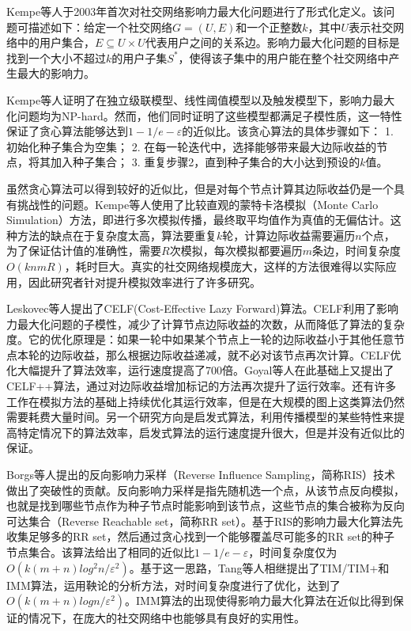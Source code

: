 Kempe等人\cite{kempe2003maximizing}于2003年首次对社交网络影响力最大化问题进行了形式化定义。该问题可描述如下：给定一个社交网络$G=(U,E)$和一个正整数$k$，其中$U$表示社交网络中的用户集合，$E \subseteq U \times U$代表用户之间的关系边。影响力最大化问题的目标是找到一个大小不超过$k$的用户子集$S^*$，使得该子集中的用户能在整个社交网络中产生最大的影响力。

Kempe等人证明了在独立级联模型、线性阈值模型以及触发模型下，影响力最大化问题均为NP-hard。然而，他们同时证明了这些模型都满足子模性质，这一特性保证了贪心算法能够达到$1-1/e-\varepsilon$的近似比。该贪心算法的具体步骤如下：
1. 初始化种子集合为空集；
2. 在每一轮迭代中，选择能够带来最大边际收益的节点，将其加入种子集合；
3. 重复步骤2，直到种子集合的大小达到预设的$k$值。

虽然贪心算法可以得到较好的近似比，但是对每个节点计算其边际收益仍是一个具有挑战性的问题。Kempe等人使用了比较直观的蒙特卡洛模拟（Monte Carlo Simulation）方法，即进行多次模拟传播，最终取平均值作为真值的无偏估计。这种方法的缺点在于复杂度太高，算法要重复$k$轮，计算边际收益需要遍历$n$个点，为了保证估计值的准确性，需要$R$次模拟，每次模拟都要遍历$m$条边，时间复杂度$O(knmR)$，耗时巨大。真实的社交网络规模庞大，这样的方法很难得以实际应用，因此研究者针对提升模拟效率进行了许多研究。

Leskovec等人提出了CELF(Cost-Effective Lazy Forward)算法\cite{leskovec2007cost}。CELF利用了影响力最大化问题的子模性，减少了计算节点边际收益的次数，从而降低了算法的复杂度。它的优化原理是：如果一轮中如果某个节点上一轮的边际收益小于其他任意节点本轮的边际收益，那么根据边际收益递减，就不必对该节点再次计算。CELF优化大幅提升了算法效率，运行速度提高了700倍。Goyal等人\cite{goyal2011celf++}在此基础上又提出了CELF++算法，通过对边际收益增加标记的方法再次提升了运行效率。还有许多工作在模拟方法的基础上持续优化其运行效率\cite{kumar2022csr,王璿2022基于社交网络的影响力最大化算法}，但是在大规模的图上这类算法仍然需要耗费大量时间。另一个研究方向是启发式算法，利用传播模型的某些特性来提高特定情况下的算法效率\cite{kumar2022mder,lozano2024efficient,chen2009efficient,chen2010scalable,chen2010scalable2,goyal2011simpath}，启发式算法的运行速度提升很大，但是并没有近似比的保证。

Borgs等人\cite{borgs2014maximizing}提出的反向影响力采样（Reverse Influence Sampling，简称RIS）技术做出了突破性的贡献。反向影响力采样是指先随机选一个点，从该节点反向模拟，也就是找到哪些节点作为种子节点时能影响到该节点，这些节点的集合被称为反向可达集合（Reverse Reachable set，简称RR set）。基于RIS的影响力最大化算法先收集足够多的RR set，然后通过贪心找到一个能够覆盖尽可能多的RR set的种子节点集合。该算法给出了相同的近似比$1-1/e-\varepsilon$，时间复杂度仅为$O(k(m+n)log^2n/\varepsilon^2)$。基于这一思路，Tang等人相继提出了TIM/TIM+\cite{tang2014influence}和IMM\cite{tang2015influence}算法，运用鞅论的分析方法，对时间复杂度进行了优化，达到了$O(k(m+n)logn/\varepsilon^2)$。IMM算法的出现使得影响力最大化算法在近似比得到保证的情况下，在庞大的社交网络中也能够具有良好的实用性。

